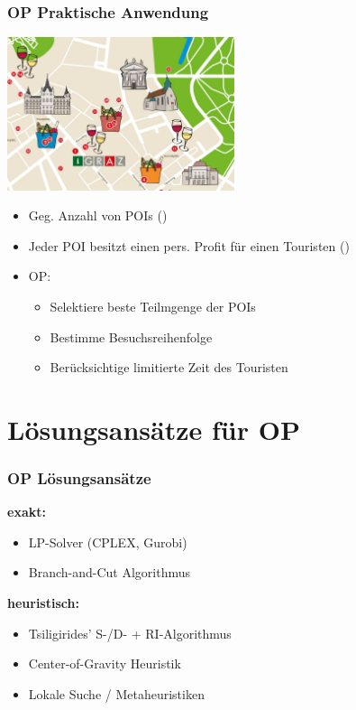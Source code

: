 \documentclass{beamer}
\begin{document}
\begin{frame}
  \frametitle{OP Praktische Anwendung}
  \centering
  \includegraphics[width=0.5\textwidth]{img/POI.png}
  \begin{itemize}
    \item Geg. Anzahl von POIs ()
    \item Jeder POI besitzt einen pers. Profit für einen Touristen ()
    \item OP:
    \begin{itemize}
      \item Selektiere beste Teilmgenge der POIs
      \item Bestimme Besuchsreihenfolge
      \item Berücksichtige limitierte Zeit des Touristen
    \end{itemize}
  \end{itemize}
\end{frame}

\section{Lösungsansätze für \textsc{OP}}

\begin{frame}
  \frametitle{OP Lösungsansätze}
  \textbf{exakt:}
  \begin{itemize}
    \item LP-Solver (CPLEX, Gurobi)
    \item Branch-and-Cut Algorithmus
  \end{itemize}
  \textbf{heuristisch:}
  \begin{itemize}
    \item Tsiligirides' S-/D- + RI-Algorithmus
    \item Center-of-Gravity Heuristik
    \item Lokale Suche / Metaheuristiken
  \end{itemize}
\end{frame}
\end{document}
